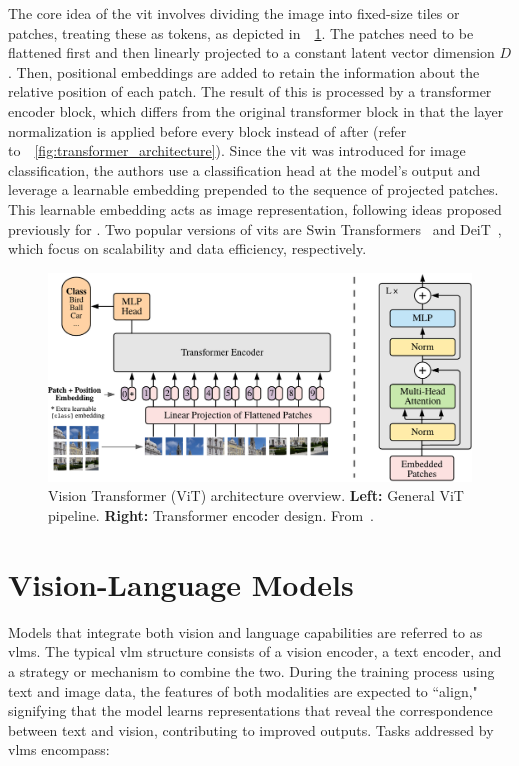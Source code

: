The core idea of the \gls{vit} involves dividing the image into fixed-size tiles or patches, treating these as tokens, as depicted in~\fig~\ref{fig:vit}. The patches need to be flattened first and then linearly projected to a constant latent vector dimension $D$. Then, positional embeddings are added to retain the information about the relative position of each patch. The result of this is processed by a transformer encoder block, which differs from the original transformer block in that the layer normalization is applied before every block instead of after (refer to~\fig~\ref{fig:transformer_architecture}). Since the \gls{vit} was introduced for image classification, the authors use a classification head at the model's output and leverage a learnable embedding prepended to the sequence of projected patches. This learnable embedding acts as image representation, following ideas proposed previously for . Two popular versions of \glspl{vit} are Swin Transformers~\cite{liu2021swin} and DeiT~\cite{touvron2021training}, which focus on scalability and data efficiency, respectively.

\begin{figure}[ht]
\begin{center}
\includegraphics[width=\textwidth]{Figures/Background/vit.png}
\caption{Vision Transformer (ViT) architecture overview. \textbf{Left:} General ViT pipeline. \textbf{Right:} Transformer encoder design. From~\cite{dosovitskiy2020image}.}
\label{fig:vit}
\end{center}
\end{figure}

\section{Vision-Language Models}

Models that integrate both vision and language capabilities are referred to as \glspl{vlm}. The typical \gls{vlm} structure consists of a vision encoder, a text encoder, and a strategy or mechanism to combine the two. During the training process using text and image data, the features of both modalities are expected to ``align," signifying that the model learns representations that reveal the correspondence between text and vision, contributing to improved outputs. Tasks addressed by \glspl{vlm} encompass:


